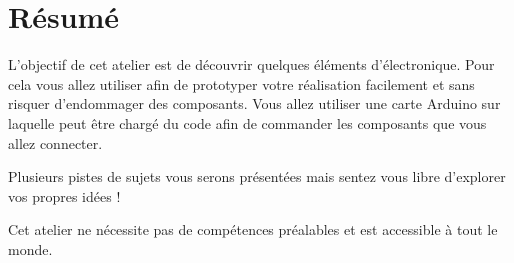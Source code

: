 \section{Résumé}
L'objectif de cet atelier est de découvrir quelques éléments d'électronique.
Pour cela vous allez utiliser  afin de prototyper votre réalisation facilement et sans risquer d'endommager des composants.
Vous allez utiliser une carte Arduino sur laquelle peut être chargé du code afin de commander les composants que vous allez connecter.

Plusieurs pistes de sujets vous serons présentées mais sentez vous libre d'explorer vos propres idées !

Cet atelier ne nécessite pas de compétences préalables et est accessible à tout le monde.